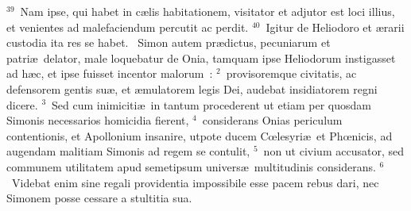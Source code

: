 ${}^{39}$~Nam ipse, qui habet in c\ae lis habitationem, visitator et adjutor est loci illius, et venientes ad malefaciendum percutit ac perdit.
${}^{40}$~Igitur de Heliodoro et \ae rarii custodia ita res se habet.
~Simon autem pr\ae dictus, pecuniarum et patri\ae\ delator, male loquebatur de Onia, tamquam ipse Heliodorum instigasset ad h\ae c, et ipse fuisset incentor malorum~:
${}^{2}$~provisoremque civitatis, ac defensorem gentis su\ae , et \ae mulatorem legis Dei, audebat insidiatorem regni dicere.
${}^{3}$~Sed cum inimiciti\ae\ in tantum procederent ut etiam per quosdam Simonis necessarios homicidia fierent,
${}^{4}$~considerans Onias periculum contentionis, et Apollonium insanire, utpote ducem Cœlesyri\ae\ et Phœnicis, ad augendam malitiam Simonis ad regem se contulit,
${}^{5}$~non ut civium accusator, sed communem utilitatem apud semetipsum univers\ae\ multitudinis considerans.
${}^{6}$~Videbat enim sine regali providentia impossibile esse pacem rebus dari, nec Simonem posse cessare a stultitia sua.


